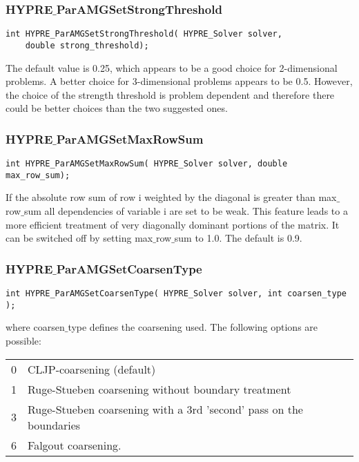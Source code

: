 \subsubsection*{HYPRE$\_$ParAMGSetStrongThreshold}
\begin{display}
\begin{verbatim}
int HYPRE_ParAMGSetStrongThreshold( HYPRE_Solver solver,
	double strong_threshold);
\end{verbatim}
\end{display}
The default value is 0.25, which appears to be a good choice for 2-dimensional
problems. A better choice for 3-dimensional problems appears to be 0.5. However,
the choice of the strength threshold is problem dependent and therefore
there could be better choices than the two suggested ones.

\subsubsection*{HYPRE$\_$ParAMGSetMaxRowSum}
\begin{display}
\begin{verbatim}
int HYPRE_ParAMGSetMaxRowSum( HYPRE_Solver solver, double max_row_sum);
\end{verbatim}
\end{display}
If the absolute row sum of row i weighted by the diagonal
is greater than max$\_$row$\_$sum all dependencies of variable i are set
to be weak. This feature leads to a more efficient treatment of very
diagonally dominant portions of the matrix.
It can be switched off by setting max$\_$row$\_$sum to 1.0.
The default is 0.9.

\subsubsection*{HYPRE$\_$ParAMGSetCoarsenType}
\begin{display}
\begin{verbatim}
int HYPRE_ParAMGSetCoarsenType( HYPRE_Solver solver, int coarsen_type  );
\end{verbatim}
\end{display}
where coarsen$\_$type defines the coarsening used. The following options 
are possible:

\begin{tabular}{l l}
  0 & CLJP-coarsening (default) \\
  1& 	Ruge-Stueben coarsening without boundary treatment \\
  3& 	Ruge-Stueben coarsening with a 3rd 'second' pass on the boundaries \\
 6 & 	Falgout coarsening. \\
\end{tabular}

